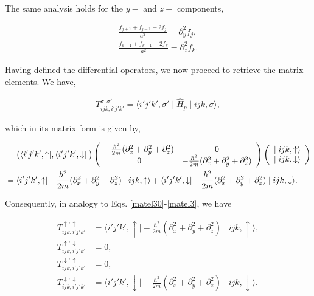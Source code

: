 \documentclass[10pt,prb,showpacs,amssymb,floatfix]{revtex4-1}
\begin{document}
The same analysis holds for the $y-$ and $z-$ components,

\begin{align}
\frac{f_{j+1} + f_{j-1} - 2f_j}{a^2} =  \partial^2_y f_j, \\
\frac{f_{k+1} + f_{k-1} - 2f_k}{a^2} =  \partial^2_z f_k. 
\label{taylor8}
\end{align}

Having defined the differential operators, we now proceed to retrieve the matrix elements. We have, 

\begin{align}
T_{ijk,i'j'k'}^{\sigma,\sigma'} = \langle i'j'k',\sigma' \mid \hat{H}_{p} \mid ijk, \sigma \rangle,
\end{align}

which in its matrix form is given by,

\begin{align}
&=  \big{(} \langle i'j'k',\uparrow \mid , \langle i'j'k',\downarrow \mid \big{)} \left(\begin{array}{cc} 
-\frac{\hbar^2}{2m} (\partial_x^2 +\partial_y^2+\partial_z^2 ) &  0\\
0 & -\frac{\hbar^2}{2m} (\partial_x^2 +\partial_y^2+\partial_z^2 )
\end{array}\right)  \left(\begin{array}{c} 
\mid ijk,\uparrow \rangle \\
\mid ijk,\downarrow \rangle
\end{array}\right) \\
&= \langle i'j'k',\uparrow \mid -\frac{\hbar^2}{2m} (\partial_x^2 +\partial_y^2+\partial_z^2 ) \mid ijk,\uparrow \rangle +  \langle i'j'k',\downarrow \mid -\frac{\hbar^2}{2m} (\partial_x^2 +\partial_y^2+\partial_z^2 ) \mid ijk,\downarrow \rangle.
\label{eqP12}
\end{align}

Consequently, in analogy to Eqs. \eqref{matel30}-\eqref{matel3}, we have
 
\begin{align}
\label{eqP1220}
T_{ijk,i'j'k'}^{\uparrow,\uparrow} &= \langle i'j'k',\uparrow \mid -\frac{\hbar^2}{2m} (\partial_x^2 +\partial_y^2+\partial_z^2 ) \mid ijk,\uparrow \rangle, \\
\label{eqP1221}
T_{ijk,i'j'k'}^{\uparrow,\downarrow} &= 0, \\
\label{eqP1222}
T_{ijk,i'j'k'}^{\downarrow,\uparrow} &= 0, \\
T_{ijk,i'j'k'}^{\downarrow,\downarrow} &= \langle i'j'k',\downarrow \mid -\frac{\hbar^2}{2m} (\partial_x^2 +\partial_y^2+\partial_z^2 ) \mid ijk,\downarrow \rangle. 
\label{eqP123}
\end{align}
\end{document}
